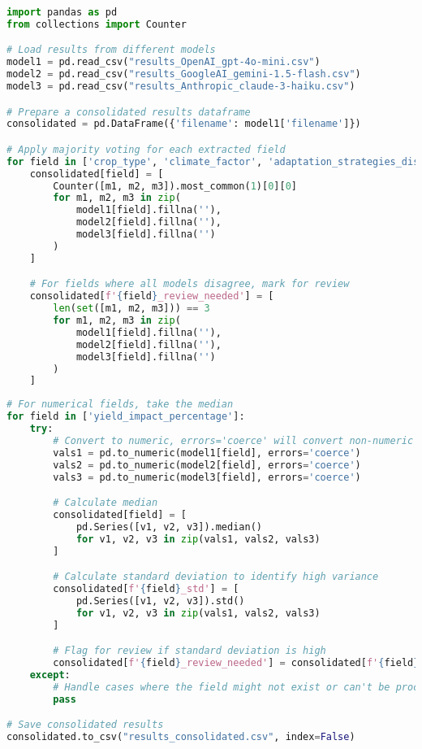 \begin{commandbox}
\begin{lstlisting}[language=Python]
import pandas as pd
from collections import Counter

# Load results from different models
model1 = pd.read_csv("results_OpenAI_gpt-4o-mini.csv")
model2 = pd.read_csv("results_GoogleAI_gemini-1.5-flash.csv")
model3 = pd.read_csv("results_Anthropic_claude-3-haiku.csv")

# Prepare a consolidated results dataframe
consolidated = pd.DataFrame({'filename': model1['filename']})

# Apply majority voting for each extracted field
for field in ['crop_type', 'climate_factor', 'adaptation_strategies_discussed']:
    consolidated[field] = [
        Counter([m1, m2, m3]).most_common(1)[0][0]
        for m1, m2, m3 in zip(
            model1[field].fillna(''),
            model2[field].fillna(''),
            model3[field].fillna('')
        )
    ]

    # For fields where all models disagree, mark for review
    consolidated[f'{field}_review_needed'] = [
        len(set([m1, m2, m3])) == 3
        for m1, m2, m3 in zip(
            model1[field].fillna(''),
            model2[field].fillna(''),
            model3[field].fillna('')
        )
    ]
\end{lstlisting}
\end{commandbox}
\begin{commandbox}
\begin{lstlisting}[language=Python]
# For numerical fields, take the median
for field in ['yield_impact_percentage']:
    try:
        # Convert to numeric, errors='coerce' will convert non-numeric to NaN
        vals1 = pd.to_numeric(model1[field], errors='coerce')
        vals2 = pd.to_numeric(model2[field], errors='coerce')
        vals3 = pd.to_numeric(model3[field], errors='coerce')

        # Calculate median
        consolidated[field] = [
            pd.Series([v1, v2, v3]).median()
            for v1, v2, v3 in zip(vals1, vals2, vals3)
        ]

        # Calculate standard deviation to identify high variance
        consolidated[f'{field}_std'] = [
            pd.Series([v1, v2, v3]).std()
            for v1, v2, v3 in zip(vals1, vals2, vals3)
        ]

        # Flag for review if standard deviation is high
        consolidated[f'{field}_review_needed'] = consolidated[f'{field}_std'] > 2.0
    except:
        # Handle cases where the field might not exist or can't be processed
        pass

# Save consolidated results
consolidated.to_csv("results_consolidated.csv", index=False)
\end{lstlisting}
\end{commandbox}

